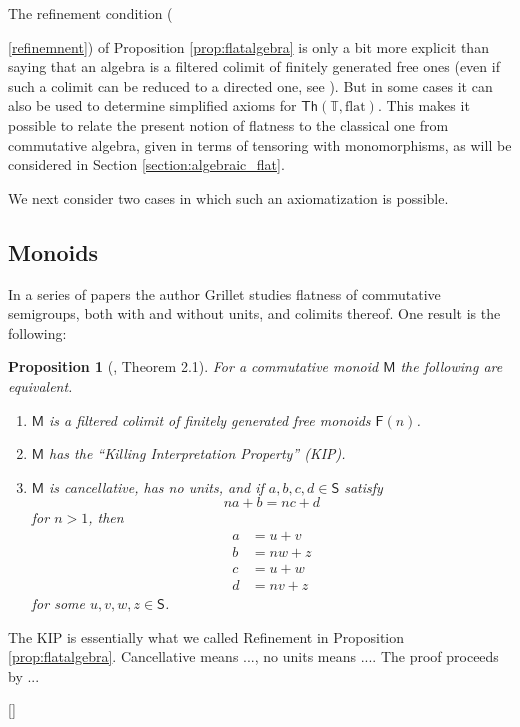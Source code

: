 \documentclass[12pt]{article}
\newcommand{\ednote}[1]{[\textit{\color{red}{#1}}]} %
\newcommand{\T}{\ensuremath{\mathbb{T}}}
\newcommand{\alg}[1]{\ensuremath{\mathsf{#1}}}
\newtheorem{proposition}[theorem]{Proposition}
\theoremstyle{remark}
\theoremstyle{definition}
\begin{document}
The refinement condition ({\ref{refinemnent}) of Proposition \ref{prop:flatalgebra} is only a bit more explicit than saying that an algebra is a filtered colimit of finitely generated free ones (even if such a colimit can be reduced to a directed one, see \cite{AR:}).  But in some cases it can also be used to determine simplified axioms for $\mathsf{Th}(\T,\mathrm{flat})$.  This makes it possible to relate the present notion of flatness to the classical one from commutative algebra, given in terms of tensoring with monomorphisms, as will be considered in Section \ref{section:algebraic_flat}.

We next consider two cases in which such an axiomatization is possible.

\subsection{Monoids}

In a series of papers \cite{Grillet:69a,Grillet:69b, Grillet:76} the author Grillet studies flatness of commutative semigroups, both with and without units, and colimits thereof.  One result is the following:

\begin{proposition}[\cite{Grillet:76}, Theorem 2.1]
For a commutative monoid $\alg{M}$ the following are equivalent.
%
\begin{enumerate}
%
\item $\alg{M}$ is a filtered colimit of finitely generated free monoids $\alg{F}(n)$.
%
\item $\alg{M}$ has the ``Killing Interpretation Property'' (KIP).
%
\item $\alg{M}$ is \emph{cancellative}, has \emph{no units}, and if $a,b,c,d \in \alg{S}$ satisfy $$na + b = nc+d$$ for $n > 1$, then
\begin{align*}
a&= u + v\\
b &= nw+z\\
c &= u+w\\
d &= nv + z
\end{align*}
for some $u, v, w, z \in \alg{S}$. 
\end{enumerate}
%
\end{proposition}

 The KIP is essentially what we called Refinement in Proposition \ref{prop:flatalgebra}.   Cancellative means ..., no units means ....
 The proof proceeds by ...
 
 \ednote{add a brief summary} 
 
}
\end{document}
